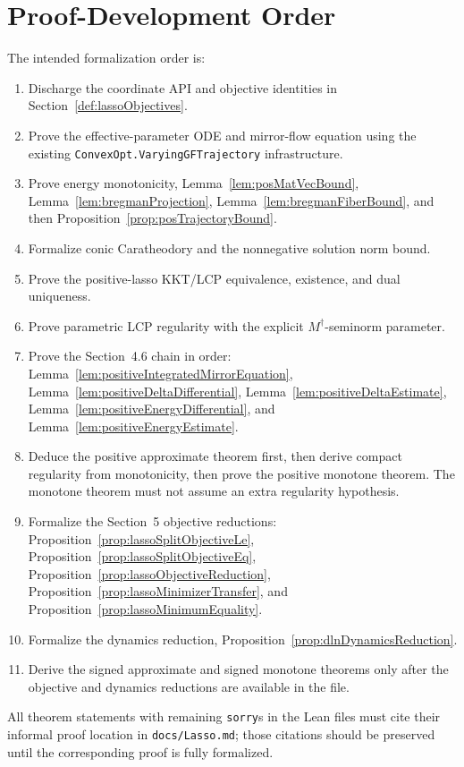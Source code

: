 \section{Proof-Development Order}

The intended formalization order is:
\begin{enumerate}
  \item Discharge the coordinate API and objective identities in
    Section~\ref{def:lassoObjectives}.
  \item Prove the effective-parameter ODE and mirror-flow equation using the
    existing \texttt{ConvexOpt.VaryingGFTrajectory} infrastructure.
  \item Prove energy monotonicity, Lemma~\ref{lem:posMatVecBound},
    Lemma~\ref{lem:bregmanProjection}, Lemma~\ref{lem:bregmanFiberBound}, and
    then Proposition~\ref{prop:posTrajectoryBound}.
  \item Formalize conic Caratheodory and the nonnegative solution norm bound.
  \item Prove the positive-lasso KKT/LCP equivalence, existence, and dual
    uniqueness.
  \item Prove parametric LCP regularity with the explicit \(M^\dagger\)-seminorm
    parameter.
  \item Prove the Section~4.6 chain in order:
    Lemma~\ref{lem:positiveIntegratedMirrorEquation},
    Lemma~\ref{lem:positiveDeltaDifferential},
    Lemma~\ref{lem:positiveDeltaEstimate},
    Lemma~\ref{lem:positiveEnergyDifferential}, and
    Lemma~\ref{lem:positiveEnergyEstimate}.
  \item Deduce the positive approximate theorem first, then derive compact
    regularity from monotonicity, then prove the positive monotone theorem.
    The monotone theorem must not assume an extra regularity hypothesis.
  \item Formalize the Section~5 objective reductions:
    Proposition~\ref{prop:lassoSplitObjectiveLe},
    Proposition~\ref{prop:lassoSplitObjectiveEq},
    Proposition~\ref{prop:lassoObjectiveReduction},
    Proposition~\ref{prop:lassoMinimizerTransfer}, and
    Proposition~\ref{prop:lassoMinimumEquality}.
  \item Formalize the dynamics reduction,
    Proposition~\ref{prop:dlnDynamicsReduction}.
  \item Derive the signed approximate and signed monotone theorems only after
    the objective and dynamics reductions are available in the file.
\end{enumerate}

All theorem statements with remaining \texttt{sorry}s in the Lean files must
cite their informal proof location in \texttt{docs/Lasso.md}; those citations
should be preserved until the corresponding proof is fully formalized.
